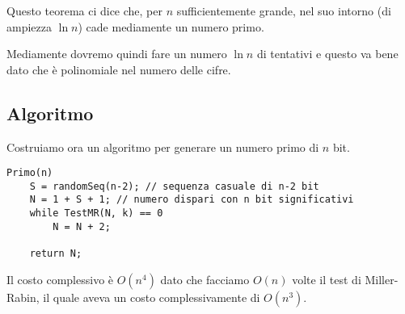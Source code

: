 Questo teorema ci dice che, per $n$ sufficientemente grande, nel suo intorno (di ampiezza $\ln n$) cade mediamente un
numero primo.

Mediamente dovremo quindi fare un numero $\ln n$ di tentativi e questo va bene dato che \`e polinomiale nel numero
delle cifre.

\subsection{Algoritmo}
Costruiamo ora un algoritmo per generare un numero primo di $n$ bit.

\begin{lstlisting}[style=pseudo-style]
Primo(n)
	S = randomSeq(n-2); // sequenza casuale di n-2 bit
	N = 1 + S + 1; // numero dispari con n bit significativi
	while TestMR(N, k) == 0 
		N = N + 2;

	return N;
\end{lstlisting}
Il costo complessivo \`e $O(n^4)$ dato che facciamo $O(n)$ volte il test di Miller-Rabin, il quale aveva un costo
complessivamente di $O(n^3)$.
